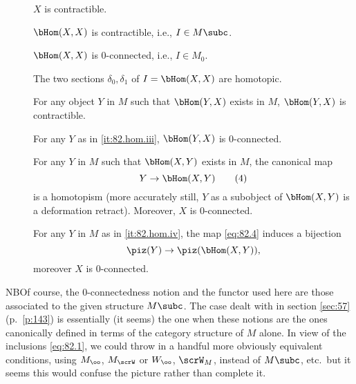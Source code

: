 \begin{description}
\item[]
  $X$ is contractible.
\item[]
  $\bHom(X,X)$ is contractible, i.e., $I\in M\subc$.
\item[]
  $\bHom(X,X)$ is $0$-connected, i.e., $I\in M_0$.
\item[]
  The two sections $\delta_0,\delta_1$ of $I=\bHom(X,X)$ are homotopic.
\item[]
  For any object $Y$ in $M$ such that $\bHom(Y,X)$ exists in $M$,
  $\bHom(Y,X)$ is contractible.
\item[]
  For any $Y$ as in \ref{it:82.hom.iii}, $\bHom(Y,X)$ is $0$-connected.
\item[]
  For any $Y$ in $M$ such that $\bHom(X,Y)$ exists in $M$, the
  canonical map
  \begin{equation}
    \label{eq:82.4}
    Y \to \bHom(X,Y)\tag{4}
  \end{equation}
  is a homotopism (more accurately still, $Y$ as a subobject of
  $\bHom(X,Y)$ is a deformation retract). Moreover, $X$ is $0$-connected.
\item[]
  For any $Y$ in $M$ as in \ref{it:82.hom.iv}, the map \eqref{eq:82.4}
  induces a bijection
  \[\piz(Y)\to\piz(\bHom(X,Y)),\]
  moreover $X$ is $0$-connected.
\end{description}
NB\enspace Of course, the $0$-connectedness notion and the functor
\piz{} used here are those associated to the given
structure $M\subc$. The case dealt with in section \ref{sec:57} (p.\
\ref{p:143}) is essentially (it seems) the one when these notions are
the ones canonically defined in terms of the category structure of $M$
alone. In view of the inclusions \eqref{eq:82.1}, we could throw in a
handful more obviously equivalent conditions, using $M_\oo$, $M_\scrW$
or $W_\oo$, $\scrW_M$, instead of $M\subc$, etc.\ but it seems this
would confuse the picture rather than complete it.

